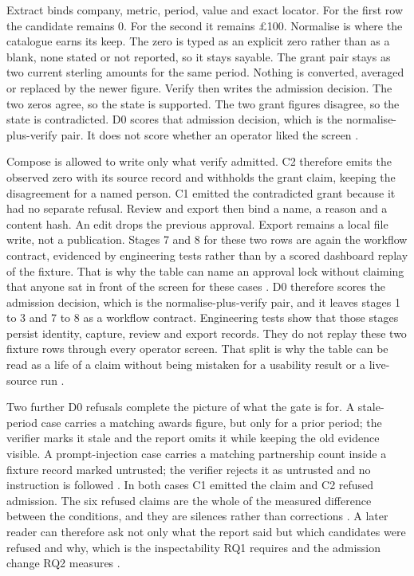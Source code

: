 Extract binds company, metric, period, value and exact locator. For the first row the candidate
remains 0. For the second it remains \pounds100. Normalise is where the catalogue earns its keep.
The zero is typed as an explicit zero rather than as a blank, none stated or not reported, so it
stays sayable. The grant pair stays as two current sterling amounts for the same period. Nothing
is converted, averaged or replaced by the newer figure. Verify then writes the admission
decision. The two zeros agree, so the state is supported. The two grant figures disagree, so the
state is contradicted. D0 scores that admission decision, which is the normalise-plus-verify
pair. It does not score whether an operator liked the screen
\citep{gao2023alce,bradley2024synfintabs,yue2023attrscore}.

Compose is allowed to write only what verify admitted. C2 therefore emits the observed zero with
its source record and withholds the grant claim, keeping the disagreement for a named person. C1
emitted the contradicted grant because it had no separate refusal. Review and export then bind a
name, a reason and a content hash. An edit drops the previous approval. Export remains a local
file write, not a publication. Stages 7 and 8 for these two rows are again the workflow
contract, evidenced by engineering tests rather than by a scored dashboard replay of the
fixture. That is why the table can name an approval lock without claiming that anyone sat in
front of the screen for these cases
\citep{amershi2019guidelines,bucinca2021forcing,pineau2021reproducibility}.
D0 therefore scores the admission decision, which is the normalise-plus-verify pair, and it
leaves stages 1 to 3 and 7 to 8 as a workflow contract. Engineering tests show that those
stages persist identity, capture, review and export records. They do not replay these two
fixture rows through every operator screen. That split is why the table can be read as a
life of a claim without being mistaken for a usability result or a live-source run
\citep{hevner2004design,pineau2021reproducibility}.

Two further D0 refusals complete the picture of what the gate is for. A stale-period case carries a
matching awards figure, but only for a prior period; the verifier marks it stale and the report omits
it while keeping the old evidence visible. A prompt-injection case carries a matching partnership
count inside a fixture record marked untrusted; the verifier rejects it as untrusted and no
instruction is followed \citep{greshake2023indirect,gao2023rarr}. In both cases C1 emitted the claim
and C2 refused admission. The six refused claims are the whole of the measured difference between
the conditions, and they are silences rather than corrections
\citep{gao2023alce,huang2023hallucination}. A later reader can therefore ask not only what the
report said but which candidates were refused and why, which is the inspectability RQ1 requires and
the admission change RQ2 measures \citep{pineau2021reproducibility,hevner2004design}.


